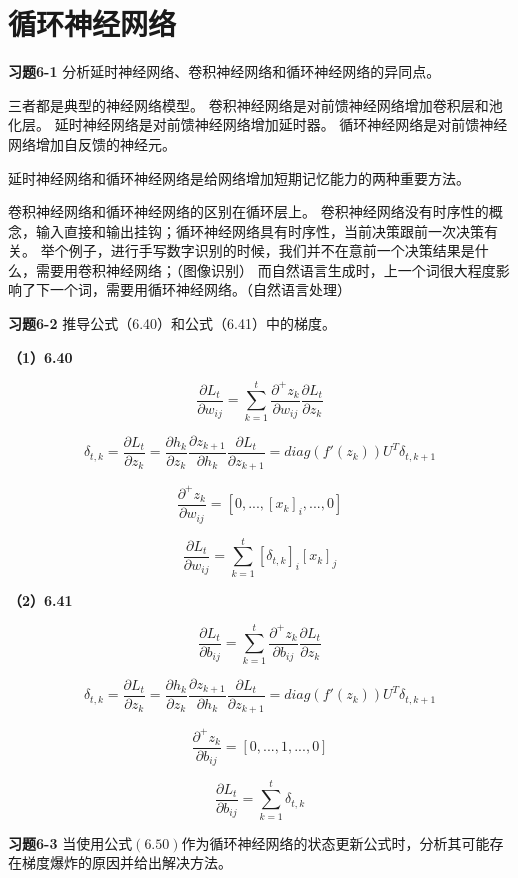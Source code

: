 \section{循环神经网络}

\noindent\textbf{习题6-1} 分析延时神经网络、卷积神经网络和循环神经网络的异同点。

三者都是典型的神经网络模型。
卷积神经网络是对前馈神经网络增加卷积层和池化层。
延时神经网络是对前馈神经网络增加延时器。
循环神经网络是对前馈神经网络增加自反馈的神经元。

延时神经网络和循环神经网络是给网络增加短期记忆能力的两种重要方法。

卷积神经网络和循环神经网络的区别在循环层上。
卷积神经网络没有时序性的概念，输入直接和输出挂钩；循环神经网络具有时序性，当前决策跟前一次决策有关。
举个例子，进行手写数字识别的时候，我们并不在意前一个决策结果是什么，需要用卷积神经网络；（图像识别）
而自然语言生成时，上一个词很大程度影响了下一个词，需要用循环神经网络。（自然语言处理）

\noindent\textbf{习题6-2} 推导公式（6.40）和公式（6.41）中的梯度。

\noindent\textbf{（1）6.40}

\[
\frac{\partial L_t}{\partial w_{ij}} = \sum_{k=1}^t \frac{\partial^+ z_k}{\partial w_{ij}} \frac{\partial L_t}{\partial z_k}
\]

\[
\delta_{t,k} = \frac{\partial L_t}{\partial z_k}
= \frac{\partial h_k}{\partial z_k} \frac{\partial z_{k+1}}{\partial h_k} \frac{\partial L_t}{\partial z_{k+1}}
= diag(f'(z_k))U^T \delta_{t,k+1}
\]

\[
\frac{\partial^+ z_k}{\partial w_{ij}} = [0,...,[x_k]_i,...,0]
\]

\[
\frac{\partial L_t}{\partial w_{ij}} = \sum_{k=1}^t [\delta_{t,k}]_i[x_k]_j
\]

\noindent\textbf{（2）6.41}

\[
\frac{\partial L_t}{\partial b_{ij}} = \sum_{k=1}^t \frac{\partial^+ z_k}{\partial b_{ij}} \frac{\partial L_t}{\partial z_k}
\]

\[
\delta_{t,k} = \frac{\partial L_t}{\partial z_k}
= \frac{\partial h_k}{\partial z_k} \frac{\partial z_{k+1}}{\partial h_k} \frac{\partial L_t}{\partial z_{k+1}}
= diag(f'(z_k))U^T \delta_{t,k+1}
\]

\[
\frac{\partial^+ z_k}{\partial b_{ij}} = [0,...,1,...,0]
\]

\[
\frac{\partial L_t}{\partial b_{ij}} = \sum_{k=1}^t \delta_{t,k}
\]

\noindent\textbf{习题6-3} 当使用公式$(6.50)$作为循环神经网络的状态更新公式时，分析其可能存在梯度爆炸的原因并给出解决方法。

